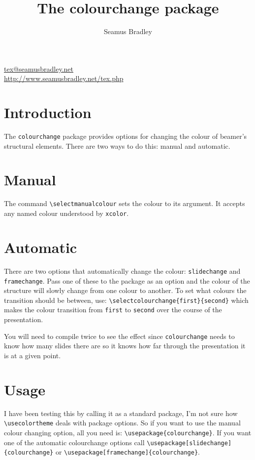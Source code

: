 \documentclass{scrartcl}
\author{Seamus Bradley}
\title{The colourchange package}
\begin{document}
\maketitle

\vspace{-2\normalbaselineskip}
\begin{center}
  \small \url{tex@seamusbradley.net}\\
  \url{http://www.seamusbradley.net/tex.php}
\end{center}

\section{Introduction}

The \lstinline+colourchange+ package provides options for changing the colour of beamer's structural elements.
There are two ways to do this: manual and automatic.

\section{Manual}

The command \lstinline+\selectmanualcolour+ sets the colour to its argument.
It accepts any named colour understood by \lstinline+xcolor+.

\section{Automatic}

There are two options that automatically change the colour: \lstinline+slidechange+ and \lstinline+framechange+.
Pass one of these to the package as an option and the colour of the structure will slowly change from one colour to another.
To set what colours the transition should be between, use: \lstinline+\selectcolourchange{first}{second}+ which makes the colour transition from
  \lstinline+first+ to \lstinline+second+ over the course of the presentation.

You will need to compile twice to see the effect since \lstinline+colourchange+ needs to know how many slides there are so it knows how far
  through the presentation it is at a given point.

\section{Usage}
I have been testing this by calling it as a standard package, I'm not sure how \lstinline+\usecolortheme+ deals with package options.
So if you want to use the manual colour changing option, all you need is: \lstinline+\usepackage{colourchange}+.
If you want one of the automatic colourchange options call \lstinline+\usepackage[slidechange]{colourchange}+ or 
  \lstinline+\usepackage[framechange]{colourchange}+.
\end{document}
